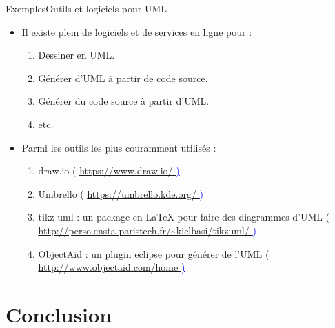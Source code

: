 \documentclass{beamer}
\begin{document}
    \begin{frame}{Exemples}{Outils et logiciels pour UML}
      \begin{itemize}
        \item {Il existe plein de logiciels et de services en ligne pour :\pause}
        \begin{enumerate}
          \item {Dessiner en UML.\pause}
          \item {Générer d'UML à partir de code source.\pause}
          \item {Générer du code source à partir d'UML.\pause}
          \item {etc.}
        \end{enumerate}
        \item {Parmi les outils les plus couramment utilisés : }
        \begin{enumerate}
          \item {draw.io
            (\textcolor{blue}{
              \underline{
                \url{
                  https://www.draw.io/
                })\pause
              }
            }
          }
          \item {Umbrello
            (\textcolor{blue}{
              \underline{
                \url{
                  https://umbrello.kde.org/
                })\pause
              }
            }
          }
          \item {
            tikz-uml : un package en LaTeX pour faire des diagrammes d'UML
            (\textcolor{blue}{
              \underline{
                \url{
                  http://perso.ensta-paristech.fr/~kielbasi/tikzuml/
                })\pause
              }
            }
          }
          \item {ObjectAid : un plugin eclipse pour générer de l'UML
            (\textcolor{blue}{
              \underline{
                \url{
                  http://www.objectaid.com/home
                })
              }
            }
          }
        \end{enumerate}
      \end{itemize}
    \end{frame}

\section*{Conclusion}
\end{document}
